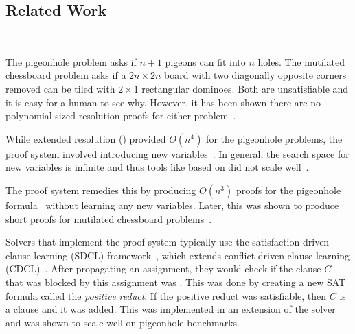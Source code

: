    




\subsection{Related Work}~\label{subsec:relatedwork}

The pigeonhole problem asks if $n+1$ pigeons can fit into $n$ holes. The
mutilated chessboard problem asks if a $2n \times 2n$ board with two diagonally
opposite corners removed can be tiled with $2 \times 1$ rectangular dominoes.
Both are unsatisfiable and it is easy for a human to see why. However, it has
been shown there are no polynomial-sized resolution proofs for either
problem~\cite{hakenpigeonhole,mutilatedchessboard-exponential}.




 While extended resolution (\er) provided $O(n^4)$ for the pigeonhole problems, the proof system involved introducing new variables~\cite{er}. In general, the search space for new variables is infinite and thus tools like \glucoser based on \er did not scale well~\cite{glucoser}.

The \pr proof system remedies this by producing $O(n^3)$ proofs for the pigeonhole formula~\cite{prclauses} without learning any new variables. Later, this was shown to produce short proofs for mutilated chessboard problems~\cite{mutilatedchessboard-pr}. 

Solvers that implement the \pr proof system typically use the satisfaction-driven clause learning (SDCL) framework~\cite{sdcl}, which extends conflict-driven clause learning (CDCL)~\cite{cdcl}. 
After propagating an assignment, they would check if the clause $C$ that was blocked by this assignment was \pr. This was done by creating a new SAT formula called the \emph{positive reduct}. If the positive reduct was satisfiable, then $C$ is a \pr clause and it was added. This was implemented in an extension of the solver \lingeling and was shown to scale well on pigeonhole benchmarks.

